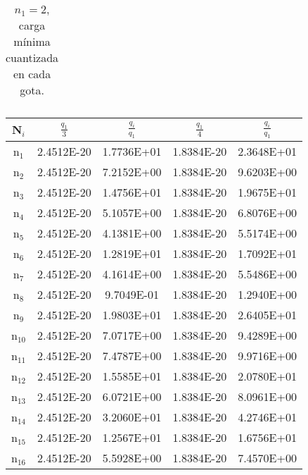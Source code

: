 \documentclass{article}
\begin{document}
\begin{enumerate}
\begin{table}[h!]
\begin{tabular}{|c|c|c|}
    \end{tabular}
    \caption{$n_{1}=2$, carga mínima cuantizada en cada gota.}
    \label{tab:my_label}
\end{table}



\begin{table}[h!]
    \centering
    \begin{tabular}{|c|c|c|c|c|}
    \hline
       N$_{i}$  & $\frac{q_{1}}{3}$ & $\frac{q_{i}}{q_{1}}$ & $\frac{q_{1}}{4}$ & $\frac{q_{i}}{q_{1}}$\\
       \hline
       n$_{1}$  & 2.4512E-20 & 1.7736E+01 & 1.8384E-20 & 2.3648E+01\\
       \hline
       n$_{2}$  & 2.4512E-20 & 7.2152E+00 & 1.8384E-20 & 9.6203E+00\\
       \hline       
       n$_{3}$  & 2.4512E-20 & 1.4756E+01 & 1.8384E-20 & 1.9675E+01\\
       \hline       
       n$_{4}$  & 2.4512E-20 & 5.1057E+00 & 1.8384E-20 & 6.8076E+00\\
       \hline       
       n$_{5}$  & 2.4512E-20 & 4.1381E+00 & 1.8384E-20 & 5.5174E+00\\
       \hline       
       n$_{6}$  & 2.4512E-20 & 1.2819E+01 & 1.8384E-20 & 1.7092E+01\\
       \hline       
       n$_{7}$  & 2.4512E-20 & 4.1614E+00 & 1.8384E-20 & 5.5486E+00\\
       \hline       
       n$_{8}$  & 2.4512E-20 & 9.7049E-01 & 1.8384E-20 & 1.2940E+00\\
       \hline       
       n$_{9}$  & 2.4512E-20 & 1.9803E+01 & 1.8384E-20 & 2.6405E+01\\
       \hline       
       n$_{10}$  & 2.4512E-20 & 7.0717E+00 & 1.8384E-20 & 9.4289E+00\\
       \hline       
       n$_{11}$  & 2.4512E-20 & 7.4787E+00 & 1.8384E-20 & 9.9716E+00\\
       \hline       
       n$_{12}$  & 2.4512E-20 & 1.5585E+01 & 1.8384E-20 & 2.0780E+01\\
       \hline       
       n$_{13}$  & 2.4512E-20 & 6.0721E+00 & 1.8384E-20 & 8.0961E+00\\
       \hline       
       n$_{14}$  & 2.4512E-20 & 3.2060E+01 & 1.8384E-20 & 4.2746E+01\\
       \hline
       n$_{15}$  & 2.4512E-20 & 1.2567E+01 & 1.8384E-20 & 1.6756E+01\\
       \hline       
       n$_{16}$  & 2.4512E-20 & 5.5928E+00 & 1.8384E-20 & 7.4570E+00\\

\end{tabular}
\end{table}
\end{enumerate}
\end{document}
